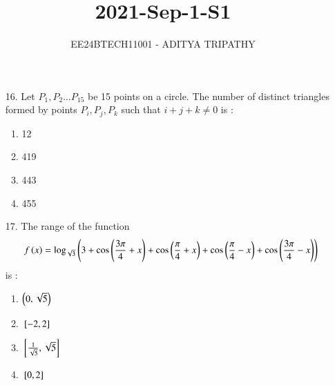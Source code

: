 \documentclass[journal,12pt,onecolumn]{IEEEtran}
\theoremstyle{remark}
\begin{document}

\vspace{3cm}

\title{2021-Sep-1-S1}
\author{EE24BTECH11001 -  ADITYA TRIPATHY}
\maketitle

\renewcommand{\thefigure}{\theenumi}
\renewcommand{\thetable}{\theenumi}

\begin{enumerate}
    \item[16.] 
        Let $P_1, P_2 \dots P_15$  be 15 points on a circle. The number of distinct triangles formed by points $P_i, P_j, P_k$ such that 
        $i + j +k \ne 0$ is :
        \hfill{}
        \begin{multicols}{4}
            \begin{enumerate}
                \item 12
                    \columnbreak
                \item 419
                    \columnbreak
                \item 443
                    \columnbreak
                \item 455
            \end{enumerate}
        \end{multicols}

    \item[17.] The range of the function 
        \begin{align}
            f\left(x\right) = \log_{\sqrt{3}} \left(3 + \cos \left(\frac{3\pi}{4} + x\right) + \cos \left(\frac{\pi}{4} + x\right)+ \cos \left(\frac{\pi}{4} - x\right) +\cos \left(\frac{3\pi}{4} - x\right)\right)
        \end{align} is :
        \hfill{}
        \begin{multicols}{4}
            \begin{enumerate}
                \item $\left(0,  \sqrt{5}\right)$ \columnbreak
                \item ${}\left[-2, 2\right]$ \columnbreak
                \item ${}\left[\frac{1}{\sqrt{5}}, \sqrt{5}\right]$ \columnbreak
                \item ${}\left[0, 2\right]$
            \end{enumerate}
        \end{multicols}



\end{enumerate}
\end{document}
